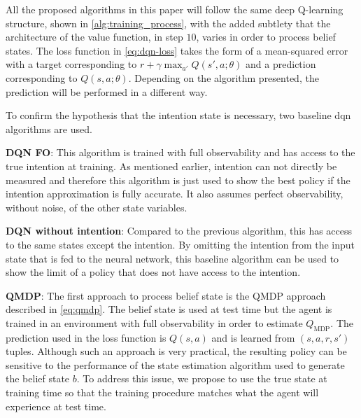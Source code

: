	All the proposed algorithms in this paper will follow the same deep Q-learning structure, shown in \ref{alg:training_process}, with the added subtlety that the architecture of the value function, in step $10$, varies in order to process belief states. 
	The loss function in \ref{eq:dqn-loss} takes the form of a mean-squared error with a target corresponding to $r +  \gamma \max_{a\prime}Q(s', a; \theta)$ and a prediction corresponding to $Q(s, a; \theta)$. 
	Depending on the algorithm presented, the prediction will be performed in a different way.
	
	To confirm the hypothesis that the intention state is necessary, two baseline \gls{dqn} algorithms are used. 
	
	\textbf{DQN FO}: This algorithm is trained with full observability and has access to the true intention at training. As mentioned earlier, intention can not directly be measured and therefore this algorithm is just used to show the best policy if the intention approximation is fully accurate. It also assumes perfect observability, without noise, of the other state variables.
	
	\textbf{DQN without intention}: Compared to the previous algorithm, this has access to the same states except the intention. By omitting the intention from the input state that is fed to the neural network, this baseline algorithm can be used to show the limit of a policy that does not have access to the intention.
	
	\textbf{QMDP}: The first approach to process belief state is the QMDP approach described in \ref{eq:qmdp}. 
	The belief state is used at test time but the agent is trained in an environment with full observability in order to estimate $Q_{\text{MDP}}$. The prediction used in the loss function is $Q(s, a)$ and is learned from $(s, a, r, s')$ tuples.
	Although such an approach is very practical, the resulting policy can be sensitive to the performance of the state estimation algorithm used to generate the belief state $b$. 
	To address this issue, we propose to use the true state at training time so that the training procedure matches what the agent will experience at test time. 
	
